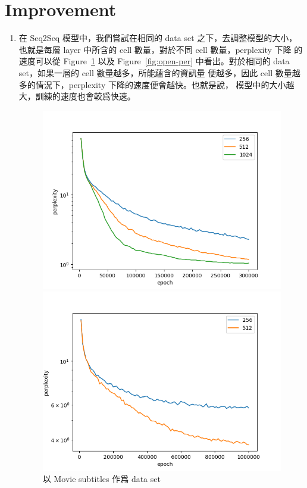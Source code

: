\documentclass[12pt, a4paper]{article}
\theoremstyle{mystyle}	%
\begin{document}
\section{Improvement}
\begin{enumerate}
\item 在 Seq2Seq 模型中，我們嘗試在相同的 data set 之下，去調整模型的大小，
  也就是每層 layer 中所含的 cell 數量，對於不同 cell 數量，perplexity 下降
  的速度可以從 Figure~\ref{fig:movie-per} 以及 Figure~\ref{fig:open-per} 
  中看出。對於相同的 data set，如果一層的 cell 數量越多，所能蘊含的資訊量
  便越多，因此 cell 數量越多的情況下，perplexity 下降的速度便會越快。也就是說，
  模型中的大小越大，訓練的速度也會較爲快速。
  \begin{figure}[!htb]
    \centering
    \includegraphics[scale=0.5]{movie_per.png}
    \caption{以 Movie subtitles 作爲 data set}
    \label{fig:movie-per}
   \endminipage
   \hfill
    \includegraphics[scale=0.5]{open_per.png}

\end{figure}
\end{enumerate}
\end{document}
